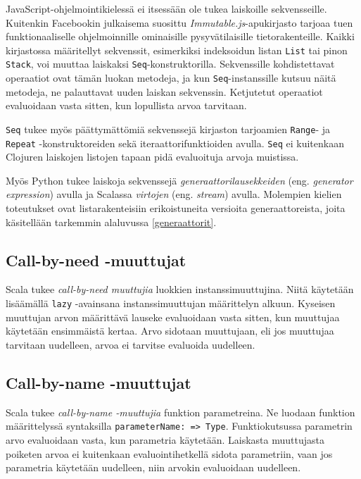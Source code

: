 JavaScript-ohjelmointikielessä ei itsessään ole tukea laiskoille sekvensseille. Kuitenkin Facebookin julkaisema suosittu \textit{Immutable.js}-apukirjasto tarjoaa tuen funktionaaliselle ohjelmoinnille ominaisille pysyvätilaisille tietorakenteille. Kaikki kirjastossa määritellyt sekvenssit, esimerkiksi indeksoidun listan \verb!List! tai pinon \verb!Stack!, voi muuttaa laiskaksi \verb!Seq!-konstruktorilla. Sekvenssille kohdistettavat operaatiot ovat tämän luokan metodeja, ja kun \verb!Seq!-instanssille kutsuu näitä metodeja, ne palauttavat uuden laiskan sekvenssin. Ketjutetut operaatiot evaluoidaan vasta sitten, kun lopullista arvoa tarvitaan.

\begin{sloppypar}
\verb!Seq! tukee myös päättymättömiä sekvenssejä kirjaston tarjoamien \verb!Range!- ja \verb!Repeat! \mbox{-konstruktoreiden} sekä iteraattorifunktioiden avulla. \verb!Seq! ei kuitenkaan Clojuren laiskojen listojen tapaan pidä evaluoituja arvoja muistissa.
\end{sloppypar}

Myös Python tukee laiskoja sekvenssejä \textit{generaattorilausekkeiden} (eng. \textit{generator expression}) avulla ja Scalassa \textit{virtojen} (eng. \textit{stream}) avulla. Molempien kielien toteutukset ovat listarakenteisiin erikoistuneita versioita generaattoreista, joita käsitellään tarkemmin alaluvussa \ref{generaattorit}.

\subsection{Call-by-need -muuttujat}

Scala tukee \textit{call-by-need muuttujia} luokkien instanssimuuttujina. Niitä käytetään lisäämällä \verb!lazy! -avainsana instanssimuuttujan määrittelyn alkuun. Kyseisen muuttujan arvon määrittävä lauseke evaluoidaan vasta sitten, kun muuttujaa käytetään ensimmäistä kertaa. Arvo sidotaan muuttujaan, eli jos muuttujaa tarvitaan uudelleen, arvoa ei tarvitse evaluoida uudelleen.

\subsection{Call-by-name -muuttujat}

Scala tukee \textit{call-by-name -muuttujia} funktion parametreina. Ne luodaan funktion määrittelyssä syntaksilla \verb!parameterName: => Type!. Funktiokutsussa parametrin arvo evaluoidaan vasta, kun parametria käytetään. Laiskasta muuttujasta poiketen arvoa ei kuitenkaan evaluointihetkellä sidota parametriin, vaan jos parametria käytetään uudelleen, niin arvokin evaluoidaan uudelleen.

